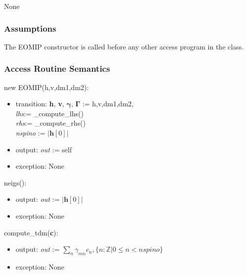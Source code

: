 \documentclass[12pt, titlepage]{article}
\begin{document}
None

\subsubsection{Assumptions}

The EOMIP constructor is called before any other access program in the class.

\subsubsection{Access Routine Semantics}

\noindent new EOMIP(h,v,dm1,dm2):
\begin{itemize}
	\item transition: \textbf{h}, \textbf{v}, $\boldsymbol{\gamma}$, 
	$\boldsymbol{\Gamma}$ := h,v,dm1,dm2,\\ \textit{lhs}:= \_compute\_lhs()\\ 
	\textit{rhs}:= \_compute\_rhs()\\
	\textit{nspino} := $|\boldsymbol{h}[0]|$\\
	\item output: \textit{out} := self 
	\item exception: None
\end{itemize}

\noindent neigs():
\begin{itemize}
	\item output: \textit{out} := $|\boldsymbol{h}[0]|$
	\item exception: None
\end{itemize}

\noindent compute\_tdm(\textbf{c}):
\begin{itemize}
	\item output: \textit{out} := $\sum_{n}\gamma_{mn} c_n, \{n:\mathbb{Z}|0 
	\le n < nspino\}$
	\item exception: None
\end{itemize}
\end{document}
